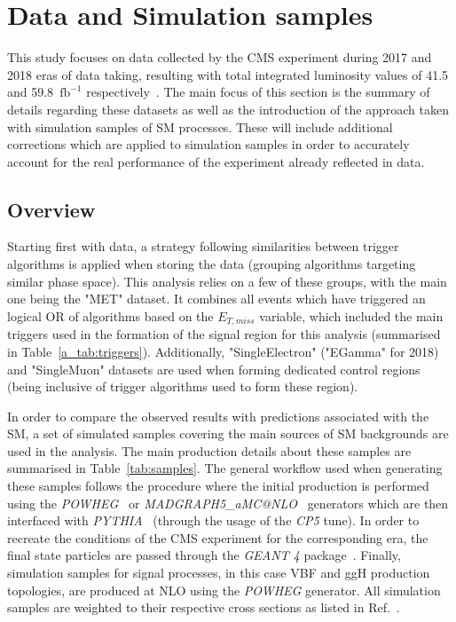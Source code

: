 \section{Data and Simulation samples}
\label{sec:object_corr}
\hspace{10pt} This study focuses on data collected by the CMS experiment during 2017 and 2018 eras of data taking, resulting with total integrated luminosity values of 41.5 and 59.8~$\text{fb}^{-1}$ respectively~\cite{pas_lumi_1,pas_lumi_2}. The main focus of this section is the summary of details regarding these datasets as well as the introduction of the approach taken with simulation samples of SM processes. These will include additional corrections which are applied to simulation samples in order to accurately account for the real performance of the experiment already reflected in data.

\subsection{Overview}
\hspace{10pt} Starting first with data, a strategy following similarities between trigger algorithms is applied when storing the data (grouping algorithms targeting similar phase space). This analysis relies on a few of these groups, with the main one being the "MET" dataset. It combines all events which have triggered an logical OR of algorithms based on the $E_{T,miss}$ variable, which included the main triggers used in the formation of the signal region for this analysis (summarised in Table~\ref{a_tab:triggers}). Additionally, "SingleElectron" ("EGamma" for 2018) and "SingleMuon" datasets are used when forming dedicated control regions (being inclusive of trigger algorithms used to form these region).

\hspace{10pt} In order to compare the observed results with predictions associated with the SM, a set of simulated samples covering the main sources of SM backgrounds are used in the analysis. The main production details about these samples are summarised in Table~\ref{tab:samples}. The general workflow used when generating these samples follows the procedure where the initial production is performed using the \emph{POWHEG}~\cite{powheg} or \emph{MADGRAPH5\_aMC@NLO}~\cite{madgraph} generators which are then interfaced with \emph{PYTHIA}~\cite{pythia} (through the usage of the \emph{CP5} tune). In order to recreate the conditions of the CMS experiment for the corresponding era, the final state particles are passed through the \emph{GEANT 4} package~\cite{geant4}. Finally, simulation samples for signal processes, in this case VBF and ggH production topologies, are produced at NLO using the \emph{POWHEG} generator. All simulation samples are weighted to their respective cross sections as listed in Ref.~\cite{note:AN_19_257}.

